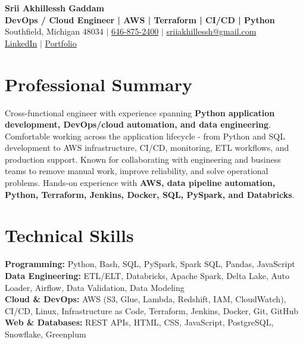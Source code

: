 \documentclass[letterpaper,10pt]{article}
\begin{document}
\fontsize{9.35pt}{10.45pt}\selectfont

\begin{center}
    {\LARGE \textbf{Srii Akhillessh Gaddam}} \\[-1pt]
    \textbf{DevOps / Cloud Engineer | AWS | Terraform | CI/CD | Python} \\[2pt]
    Southfield, Michigan 48034 $|$
    \href{tel:6468752400}{646-875-2400} $|$
    \href{mailto:sriiakhillessh@gmail.com}{sriiakhillessh@gmail.com} \\[1pt]
    \href{https://www.linkedin.com/in/srii-akhiilessh-gaddam-b48668191/}{LinkedIn} $|$
    \href{https://sriiakhillesshg.github.io/portfolio/}{Portfolio}
\end{center}
\vspace{-8pt}

\section{Professional Summary}
\small{Cross-functional engineer with experience spanning \textbf{Python application development, DevOps/cloud automation, and data engineering}. Comfortable working across the application lifecycle - from Python and SQL development to AWS infrastructure, CI/CD, monitoring, ETL workflows, and production support. Known for collaborating with engineering and business teams to remove manual work, improve reliability, and solve operational problems. Hands-on experience with \textbf{AWS, data pipeline automation, Python, Terraform, Jenkins, Docker, SQL, PySpark, and Databricks}.}

\section{Technical Skills}
\small{
\textbf{Programming:} Python, Bash, SQL, PySpark, Spark SQL, Pandas, JavaScript \\
\textbf{Data Engineering:} ETL/ELT, Databricks, Apache Spark, Delta Lake, Auto Loader, Airflow, Data Validation, Data Modeling \\
\textbf{Cloud \& DevOps:} AWS (S3, Glue, Lambda, Redshift, IAM, CloudWatch), CI/CD, Linux, Infrastructure as Code, Terraform, Jenkins, Docker, Git, GitHub \\
\textbf{Web \& Databases:} REST APIs, HTML, CSS, JavaScript, PostgreSQL, Snowflake, Greenplum
}
\end{document}
